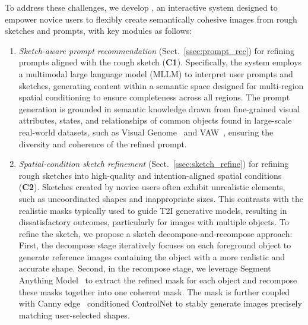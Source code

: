 To address these challenges, we develop \tool, an interactive system designed to empower novice users to flexibly create semantically cohesive images from rough sketches and prompts, with key modules as follows: 
\begin{enumerate}
\item \emph{Sketch-aware prompt recommendation} (Sect.~\ref{ssec:prompt_rec}) for refining prompts aligned with the rough sketch (\textbf{C1}).
Specifically, the system employs a multimodal large language model (MLLM) to interpret user prompts and sketches, generating content within a semantic space designed for multi-region spatial conditioning to ensure completeness across all regions. The prompt generation is grounded in semantic knowledge drawn from fine-grained visual attributes, states, and relationships of common objects found in large-scale real-world datasets, such as Visual Genome~\cite{krishna2017visual} and VAW~\cite{pham2021learning}, ensuring the diversity and coherence of the refined prompt.

\item \emph{Spatial-condition sketch refinement} (Sect.~\ref{ssec:sketch_refine}) for refining rough sketches into high-quality and intention-aligned spatial conditions (\textbf{C2}).
Sketches created by novice users often exhibit unrealistic elements, such as uncoordinated shapes and inappropriate sizes.
This contrasts with the realistic masks typically used to guide T2I generative models, resulting in dissatisfactory outcomes, particularly for images with multiple objects.
To refine the sketch, we propose a sketch decompose-and-recompose approach:
First, the decompose stage iteratively focuses on each foreground object to generate reference images containing the object with a more realistic and accurate shape.
Second, in the recompose stage, we leverage Segment Anything Model~\cite{kirillov2023segment} to extract the refined mask for each object and recompose these masks together into one coherent mask.
The mask is further coupled with Canny edge~\cite{canny1986computational} conditioned ControlNet to stably generate images precisely matching user-selected shapes.

    
\end{enumerate}

